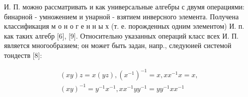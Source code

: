 \documentclass[10pt]{article}
\begin{document}
И. П. можно рассматривать и как универсальные алгебры с двумя операциями: бинарной - умножением и унарной - взятием инверсного элемента. Получена классификация м о н о г е н н ы х (т. е. порожденных одним элементом) И. п. как таких алгебр [6], [9]. Относительно указанных операций класс всех И. П. является многообразием; он может быть задан, напр., следуюией системой тондеств [8]:



\[

\begin{gathered}

(x y) z=x(y z),\left(x^{-1}\right)^{-1}=x, x x^{-1} x=x, \\

(x y)^{-1}=y^{-1} x^{-1}, x x^{-1} y y^{-1}=y y^{-1} x x^{-1}

\end{gathered}

\]
\end{document}
